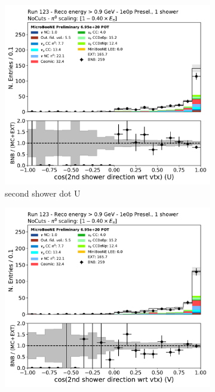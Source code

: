 \begin{figure}[H]
    \centering
    \begin{subfigure}{0.3\textwidth}
    \includegraphics[width=1.0\textwidth]{1e0p/High_E_Sideband/secondshower_U_dot.pdf}
    \caption{second shower dot U}
    \end{subfigure}
    \begin{subfigure}{0.3\textwidth}
    \includegraphics[width=1.0\textwidth]{1e0p/High_E_Sideband/secondshower_V_dot.pdf}

\end{subfigure}
\end{figure}
